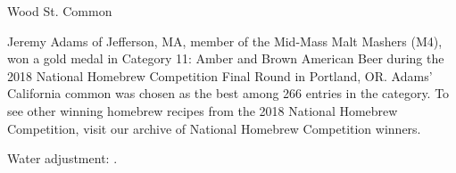 \stylesection{\stylecaliforniacommon}

\begin{recipe}{Wood St. Common}

\begin{aboutblock}
Jeremy Adams of Jefferson, MA, member of the Mid-Mass Malt Mashers (M4), won a
gold medal in Category 11: Amber and Brown American Beer during the 2018 National
Homebrew Competition Final Round in Portland, OR. Adams' California common was
chosen as the best among 266 entries in the category. To see other winning homebrew
recipes from the 2018 National Homebrew Competition, visit our archive of National
Homebrew Competition winners. \sourceaha
\end{aboutblock}


\begin{methodandtiming}
 
\begin{mashsteps}
\end{mashsteps}

\begin{fermentationsteps}
\end{fermentationsteps}

\begin{directions}
Water adjustment: .
\end{directions}

\end{methodandtiming}

\recipebreak

\begin{ingredientsblock}

\begin{malts}
\end{malts}

\begin{hops}
\end{hops}


\end{ingredientsblock}

\end{recipe}

